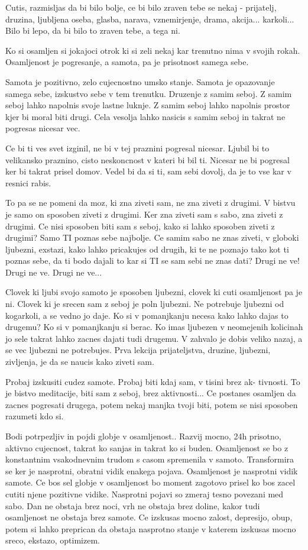 Cutis, razmisljas da bi bilo bolje, ce bi bilo zraven tebe se nekaj - prijatelj, druzina, ljubljena oseba, glasba, narava, vznemirjenje, drama, akcija... karkoli... Bilo bi lepo, da bi bilo to zraven tebe, a tega ni. 

Ko si osamljen si jokajoci otrok ki si zeli nekaj kar trenutno nima v svojih rokah. Osamljenost je pogresanje, a samota, pa je prisotnost samega sebe. 

Samota je pozitivno, zelo cujecnostno umsko stanje. Samota je opazovanje samega sebe, izskustvo sebe v tem trenutku. Druzenje z samim seboj.  Z samim seboj lahko napolnis svoje lastne luknje. Z samim seboj lahko napolnis prostor kjer bi moral biti drugi. Cela vesolja lahko nasicis s samim seboj in takrat ne pogresas nicesar vec. 

Ce bi ti ves svet izginil, ne bi v tej praznini pogresal nicesar.  Ljubil bi to velikansko praznino, cisto neskoncnost v kateri bi bil ti. Nicesar ne bi pogresal ker bi takrat prisel domov. Vedel bi da si ti, sam sebi dovolj, da je to vse kar v resnici rabis. 

To pa se ne pomeni da moz, ki zna ziveti sam, ne zna ziveti z drugimi. V bistvu je samo on sposoben ziveti z drugimi. Ker zna ziveti sam s sabo, zna ziveti z drugimi. Ce nisi sposoben biti sam s seboj, kako si lahko sposoben ziveti z drugimi? Samo TI poznas sebe najbolje. Ce samim sabo ne znas ziveti, v globoki ljubezni, exstazi, kako lahko pricakujes od drugih, ki te ne poznajo tako kot ti poznas sebe, da ti bodo dajali to kar si TI se sam sebi ne znas dati? Drugi ne ve! Drugi ne ve. Drugi ne ve... 

Clovek ki ljubi svojo samoto je sposoben ljubezni, clovek ki cuti osamljenost pa je ni. Clovek ki je srecen sam z seboj je poln ljubezni. Ne potrebuje ljubezni od kogarkoli, a se vedno jo daje. Ko si v pomanjkanju necesa kako lahko dajas to drugemu? Ko si v pomanjkanju si berac. Ko imas ljubezen v neomejenih kolicinah jo sele takrat lahko zacnes dajati tudi drugemu. V zahvalo je dobis veliko nazaj, a se vec ljubezni ne potrebujes.  Prva lekcija prijateljstva, druzine, ljubezni, zivljenja, je da se naucis kako ziveti sam. 

Probaj izskusiti cudez samote. Probaj biti kdaj sam, v tisini brez ak-
tivnosti. To je bistvo meditacije, biti sam z seboj, brez aktivnosti... Ce postanes osamljen da zacnes pogresati drugega, potem nekaj manjka tvoji biti, potem se nisi sposoben razumeti kdo si. 

Bodi potrpezljiv in pojdi globje v osamljenost.. Razvij mocno, 24h prisotno, aktivno cujecnost, takrat ko sanjas in takrat ko si buden. Osamljenost se bo z konstantnim vsakodnevnim trudom s casom spremenila v samoto. Transformira se ker je nasprotni, obratni vidik enakega pojava. Osamljenost je nasprotni vidik samote. Ce bos sel globje v osamljenost bo moment zagotovo prisel ko bos zacel cutiti njene pozitivne vidike. Nasprotni pojavi so zmeraj tesno povezani med sabo. Dan ne obstaja brez noci, vrh ne obstaja brez doline, kakor tudi osamljenost ne obstaja brez samote. Ce izskusas mocno zalost, depresijo, obup, potem si lahko preprican da obstaja nasprotno stanje v katerem izskusas mocno sreco, ekstazo, optimizem. 

